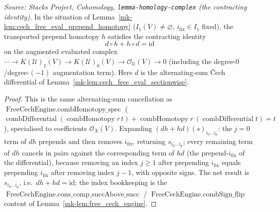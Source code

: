 \begin{lemma}
  \label{mk-lem:cech_free_eval_prepend_homotopy_spec}
  \textit{Source: Stacks Project, Cohomology, \texttt{lemma-homology-complex}
  (the contracting identity).}
  In the situation of Lemma~\ref{mk-lem:cech_free_eval_prepend_homotopy}
  (\(I_1(V) \neq \varnothing\), \(i_{\mathrm{fix}} \in I_1\) fixed), the transported
  prepend homotopy \(h\) satisfies the contracting identity
  \[
    d \circ h + h \circ d = \mathrm{id}
  \]
  on the augmented evaluated complex
  \(\cdots \to K(\mathcal{U})_1(V) \to K(\mathcal{U})_0(V) \to
  \mathcal{O}_{\mathcal{U}}(V) \to 0\) (including the degree-\(0\)/degree-\((-1)\)
  augmentation term). Here \(d\) is the alternating-sum {\v C}ech differential of
  Lemma~\ref{mk-lem:cech_free_eval_sectionwise}.
\end{lemma}

\begin{proof}
  This is the same alternating-sum cancellation as
  \(\operatorname{FreeCechEngine.combHomotopy\_spec}\)
  (\(\operatorname{combDifferential}(\operatorname{combHomotopy} r\, t) +
  \operatorname{combHomotopy} r\, (\operatorname{combDifferential} t) = t\)),
  specialised to coefficients \(\mathcal{O}_X(V)\). Expanding
  \((dh + hd)(s)_{i_0 \ldots i_p}\): the \(j = 0\) term of \(dh\) prepends and then
  removes \(i_{\mathrm{fix}}\), returning \(s_{i_0 \ldots i_p}\); every remaining term
  of \(dh\) cancels in pairs against the corresponding term of \(hd\) (the
  prepend-\(i_{\mathrm{fix}}\) of the differential), because removing an index
  \(j \geq 1\) after prepending \(i_{\mathrm{fix}}\) equals prepending
  \(i_{\mathrm{fix}}\) after removing index \(j-1\), with opposite signs. The net
  result is \(s_{i_0 \ldots i_p}\), i.e.\ \(dh + hd = \mathrm{id}\); the index
  bookkeeping is the \(\operatorname{FreeCechEngine.cons\_comp\_succAbove\_succ}\) /
  \(\operatorname{FreeCechEngine.combSign\_flip}\) content of
  Lemma~\ref{mk-lem:free_cech_engine}.
\end{proof}

